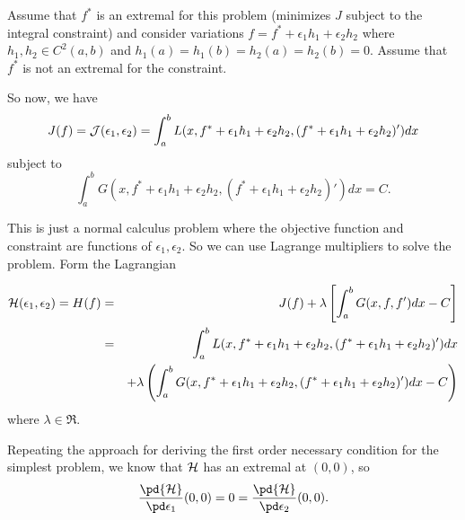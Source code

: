 Assume that $f^*$ is an extremal for this problem (minimizes $J$ subject to the integral constraint) and consider variations $f = f^* + \epsilon_1 h_1 + \epsilon_2 h_2$ where $h_1, h_2 \in C^2(a,b)$ and $h_1(a) = h_1(b) = h_2(a) = h_2(b) = 0.$  Assume that $f^*$ is not an extremal for the constraint.

So now, we have 
$$ J(f) = {\cal J}(\epsilon_1,\epsilon_2) = \int_a^b L(x, f^* + \epsilon_1 h_1 + \epsilon_2 h_2, (f^* + \epsilon_1 h_1 + \epsilon_2 h_2)') dx$$
subject to
$$ \int_a^b G(x, f^* + \epsilon_1 h_1 + \epsilon_2 h_2, (f^* + \epsilon_1 h_1 + \epsilon_2 h_2)')dx = C.$$

This is just a normal calculus problem where the objective function and constraint are functions of $\epsilon_1,\epsilon_2$. So we can use Lagrange multipliers to solve the problem. Form the Lagrangian 

\begin{eqnarray*}
{\cal H}(\epsilon_1,\epsilon_2) = H(f) &=& J(f) + \lambda\left[\int_a^b G(x, f, f')dx -C\right]\\
&=&\int_a^b L(x, f^* + \epsilon_1 h_1 + \epsilon_2 h_2, (f^* + \epsilon_1 h_1 + \epsilon_2 h_2)') dx \\
&&+ \lambda\left(\int_a^b G(x, f^* + \epsilon_1 h_1 + \epsilon_2 h_2, (f^* + \epsilon_1 h_1 + \epsilon_2 h_2)')dx - C\right)
\end{eqnarray*}
where $\lambda \in \Re$.

Repeating the approach for deriving the first order necessary condition for the simplest problem, we know that $\cal H$ has an extremal at $(0,0)$, so 
$$\frac{\pd {\cal H}}{\pd \epsilon_1}(0,0) = 0 = \frac{\pd {\cal H}}{\pd \epsilon_2}(0,0).$$

